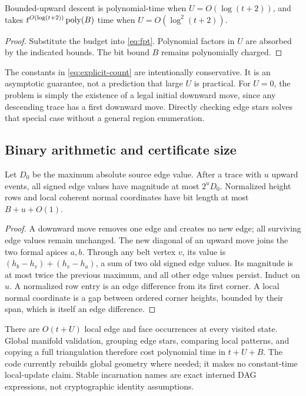 \begin{corollary}\label{cor:qp}
Bounded-upward descent is polynomial-time when $U=O(\log(t+2))$, and takes
$t^{O(\log(t+2))}\operatorname{poly}(B)$ time when $U=O(\log^2(t+2))$.
\end{corollary}
\begin{proof}
Substitute the budget into \eqref{eq:fpt}. Polynomial factors in $U$ are
absorbed by the indicated bounds. The bit bound $B$ remains polynomially
charged.
\end{proof}

The constants in \eqref{eq:explicit-count} are intentionally conservative.
It is an asymptotic guarantee, not a prediction that large $U$ is practical.
For $U=0$, the problem is simply the existence of a legal initial downward
move, since any descending trace has a first downward move. Directly checking
edge stars solves that special case without a general region enumeration.

\subsection{Binary arithmetic and certificate size}

\begin{lemma}\label{lem:bits}
Let $D_0$ be the maximum absolute source edge value. After a trace with $u$
upward events, all signed edge values have magnitude at most $2^uD_0$.
Normalized height rows and local coherent normal coordinates have bit
length at most $B+u+O(1)$.
\end{lemma}
\begin{proof}
A downward move removes one edge and creates no new edge; all surviving
edge values remain unchanged. The new diagonal of an upward move joins
the two formal apices $a,b$. Through any belt vertex $v$, its value is
$(h_b-h_v)+(h_v-h_a)$, a sum of two old signed edge values. Its magnitude
is at most twice the previous maximum, and all other edge values persist.
Induct on $u$. A normalized row entry is an edge difference from its first
corner. A local normal coordinate is a gap between ordered corner heights,
bounded by their span, which is itself an edge difference.
\end{proof}

There are $O(t+U)$ local edge and face occurrences at every visited state.
Global manifold validation, grouping edge stars, comparing local patterns,
and copying a full triangulation therefore cost polynomial time in
$t+U+B$. The code currently rebuilds global geometry where needed; it makes
no constant-time local-update claim. Stable incarnation names are exact
interned DAG expressions, not cryptographic identity assumptions.

